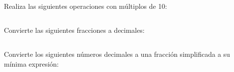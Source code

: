 \documentclass[12pt,addpoints]{evalua}
\begin{document}
\begin{questions}
\begin{multicols}{2}
    \end{multicols}

    \subsection*{\else{}\fi}

    \question[2] Realiza las siguientes operaciones con múltiplos de 10:

    \begin{multicols}{2}
    \end{multicols}


    \subsection*{\else{}\fi}
    \question[2] Convierte las siguientes fracciones a decimales:
    \begin{multicols}{2}
    \end{multicols}

    \subsection*{\else{}\fi}
    \question[2] Convierte los siguientes números decimales a una fracción simplificada a su mínima expresión:
    \begin{multicols}{2}
        \begin{parts}

\end{parts}
\end{multicols}
\end{questions}
\end{document}
